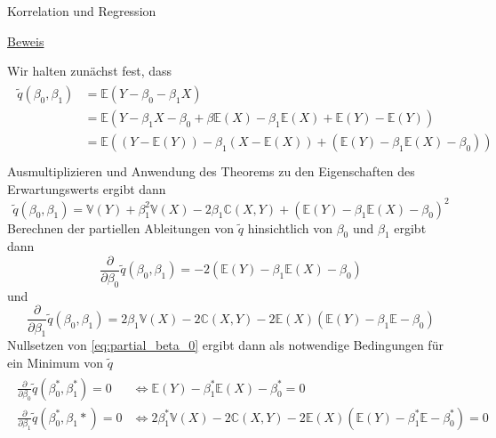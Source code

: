 \documentclass[
  8pt,
  ignorenonframetext,
]{beamer}
\begin{document}
\begin{frame}{Korrelation und Regression}
\protect\hypertarget{korrelation-und-regression-3}{}
\tiny
{}
\tiny
\setlength{\abovedisplayskip}{3pt}
\setlength{\belowdisplayskip}{3pt}

\underline{Beweis}

Wir halten zunächst fest, dass \begin{align}
\begin{split}
\tilde{q}(\beta_0,\beta_1)
& = \mathbb{E}\left(Y - \beta_0 - \beta_1 X \right) \\
& = \mathbb{E}\left(Y - \beta_1 X - \beta_0 + \beta\mathbb{E}(X) - \beta_1\mathbb{E}(X) + \mathbb{E}(Y) - \mathbb{E}(Y) \right) \\
& = \mathbb{E}\left((Y - \mathbb{E}(Y)) - \beta_1(X - \mathbb{E}(X)) + (\mathbb{E}(Y) - \beta_1\mathbb{E}(X) - \beta_0)\right) \\
\end{split}
\end{align} Ausmultiplizieren und Anwendung des Theorems zu den
Eigenschaften des Erwartungswerts ergibt dann \begin{equation}
\tilde{q}(\beta_0,\beta_1) = \mathbb{V}(Y) + \beta_1^2 \mathbb{V}(X) - 2 \beta_1 \mathbb{C}(X,Y) + \left(\mathbb{E}(Y) - \beta_1 \mathbb{E}(X) - \beta_0\right)^2
\end{equation} Berechnen der partiellen Ableitungen von \(\tilde{q}\)
hinsichtlich von \(\beta_0\) und \(\beta_1\) ergibt dann
\begin{equation}\label{eq:partial_beta_0}
\frac{\partial}{\partial \beta_0}\tilde{q}(\beta_0,\beta_1) = -2\left(\mathbb{E}(Y) - \beta_1 \mathbb{E}(X) - \beta_0\right)
\end{equation} und \begin{equation}
\frac{\partial}{\partial \beta_1}\tilde{q}(\beta_0,\beta_1) = 2\beta_1\mathbb{V}(X) - 2\mathbb{C}(X,Y) - 2\mathbb{E}(X)\left(\mathbb{E}(Y) - \beta_1\mathbb{E} - \beta_0\right)
\end{equation} Nullsetzen von \eqref{eq:partial_beta_0} ergibt dann als
notwendige Bedingungen für ein Minimum von \(\tilde{q}\) \begin{align}
\begin{split}
\frac{\partial}{\partial \beta_0}\tilde{q}(\beta_0^*,\beta_1^*)     = 0
& \Leftrightarrow
\mathbb{E}(Y) - \beta_1^* \mathbb{E}(X) - \beta_0^* = 0 \\
\frac{\partial}{\partial \beta_1}\tilde{q}(\beta_0^*,\beta_1*)  = 0
& \Leftrightarrow
2\beta_1^*\mathbb{V}(X) - 2\mathbb{C}(X,Y) - 2\mathbb{E}(X)\left(\mathbb{E}(Y) - \beta_1^*\mathbb{E} - \beta_0^*\right) = 0

\end{split}
\end{align}
\end{frame}
\end{document}
